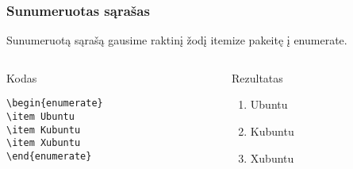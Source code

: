 \documentclass[11pt,a4paper]{beamer}
\begin{document}
\begin{frame}[fragile]
    \frametitle{Sunumeruotas sąrašas}
    Sunumeruotą sąrašą gausime raktinį žodį itemize pakeitę į enumerate.
    \begin{columns}[t]
        \begin{column}{5cm}
            \begin{block}{Kodas}
                \begin{lstlisting}
\begin{enumerate}
\item Ubuntu
\item Kubuntu
\item Xubuntu 
\end{enumerate}
                \end{lstlisting}
            \end{block}
        \end{column}
        \begin{column}{5cm}
            \begin{block}{Rezultatas}
                \begin{enumerate}
                    \item Ubuntu
                    \item Kubuntu
                    \item Xubuntu 
                \end{enumerate}
            \end{block}
        \end{column}
    \end{columns}
\end{frame}
\end{document}
